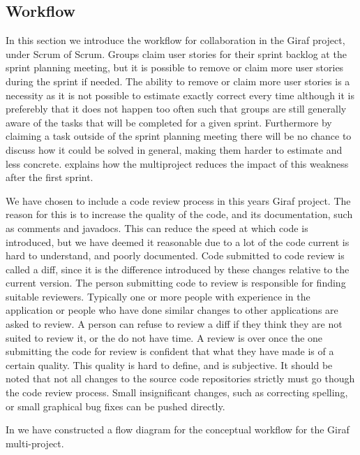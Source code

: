\subsection*{Workflow}
In this section we introduce the workflow for collaboration in the Giraf project, under Scrum of Scrum. 
Groups claim user stories for their sprint backlog at the sprint planning meeting, but it is possible to remove or claim more user stories during the sprint if needed. 
The ability to remove or claim more user stories is a necessity as it is not possible to estimate exactly correct every time although it is preferebly that it does not happen too often such that groups are still generally aware of the tasks that will be completed for a given sprint.
Furthermore by claiming a task outside of the sprint planning meeting there will be no chance to discuss how it could be solved in general, making them harder to estimate and less concrete.
 explains how the multiproject reduces the impact of this weakness after the first sprint.

\bigskip 
\noindent
We have chosen to include a code review process in this years Giraf project. 
The reason for this is to increase the quality of the code, and its documentation, such as comments and javadocs. 
This can reduce the speed at which code is introduced, but we have deemed it reasonable due to a lot of the code current is hard to understand, and poorly documented. 
Code submitted to code review is called a diff, since it is the difference introduced by these changes relative to the current version. 
The person submitting code to review is responsible for finding suitable reviewers.
Typically one or more people with experience in the application or people who have done similar changes to other applications are asked to review.
A person can refuse to review a diff if they think they are not suited to review it, or the do not have time. 
A review is over once the one submitting the code for review is confident that what they have made is of a certain quality.
This quality is hard to define, and is subjective.
It should be noted that not all changes to the source code repositories strictly must go though the code review process.
Small insignificant changes, such as correcting spelling, or small graphical bug fixes can be pushed directly. 

In  we have constructed a flow diagram for the conceptual workflow for the Giraf multi-project. 

